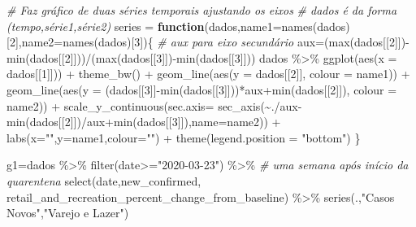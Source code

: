\documentclass[
]{book}
\newenvironment{Shaded}{\begin{snugshade}}{\end{snugshade}}
\newcommand{\AttributeTok}[1]{\textcolor[rgb]{0.77,0.63,0.00}{#1}}
\newcommand{\CommentTok}[1]{\textcolor[rgb]{0.56,0.35,0.01}{\textit{#1}}}
\newcommand{\ControlFlowTok}[1]{\textcolor[rgb]{0.13,0.29,0.53}{\textbf{#1}}}
\newcommand{\DecValTok}[1]{\textcolor[rgb]{0.00,0.00,0.81}{#1}}
\newcommand{\FunctionTok}[1]{\textcolor[rgb]{0.00,0.00,0.00}{#1}}
\newcommand{\NormalTok}[1]{#1}
\newcommand{\OtherTok}[1]{\textcolor[rgb]{0.56,0.35,0.01}{#1}}
\newcommand{\SpecialCharTok}[1]{\textcolor[rgb]{0.00,0.00,0.00}{#1}}
\newcommand{\StringTok}[1]{\textcolor[rgb]{0.31,0.60,0.02}{#1}}
\begin{document}
\begin{Shaded}
\begin{Highlighting}[]
\CommentTok{\# Faz gráfico de duas séries temporais ajustando os eixos}
\CommentTok{\# dados é da forma (tempo,série1,série2)}
\NormalTok{series }\OtherTok{=} \ControlFlowTok{function}\NormalTok{(dados,}\AttributeTok{name1=}\FunctionTok{names}\NormalTok{(dados)[}\DecValTok{2}\NormalTok{],}\AttributeTok{name2=}\FunctionTok{names}\NormalTok{(dados)[}\DecValTok{3}\NormalTok{])\{}
  \CommentTok{\# aux para eixo secundário}
\NormalTok{  aux}\OtherTok{=}\NormalTok{(}\FunctionTok{max}\NormalTok{(dados[[}\DecValTok{2}\NormalTok{]])}\SpecialCharTok{{-}}\FunctionTok{min}\NormalTok{(dados[[}\DecValTok{2}\NormalTok{]]))}\SpecialCharTok{/}\NormalTok{(}\FunctionTok{max}\NormalTok{(dados[[}\DecValTok{3}\NormalTok{]])}\SpecialCharTok{{-}}\FunctionTok{min}\NormalTok{(dados[[}\DecValTok{3}\NormalTok{]])) }
\NormalTok{  dados }\SpecialCharTok{\%\textgreater{}\%} \FunctionTok{ggplot}\NormalTok{(}\FunctionTok{aes}\NormalTok{(}\AttributeTok{x =}\NormalTok{ dados[[}\DecValTok{1}\NormalTok{]])) }\SpecialCharTok{+} \FunctionTok{theme\_bw}\NormalTok{() }\SpecialCharTok{+}
    \FunctionTok{geom\_line}\NormalTok{(}\FunctionTok{aes}\NormalTok{(}\AttributeTok{y =}\NormalTok{ dados[[}\DecValTok{2}\NormalTok{]], }\AttributeTok{colour =}\NormalTok{ name1)) }\SpecialCharTok{+}
    \FunctionTok{geom\_line}\NormalTok{(}\FunctionTok{aes}\NormalTok{(}\AttributeTok{y =}\NormalTok{ (dados[[}\DecValTok{3}\NormalTok{]]}\SpecialCharTok{{-}}\FunctionTok{min}\NormalTok{(dados[[}\DecValTok{3}\NormalTok{]]))}\SpecialCharTok{*}\NormalTok{aux}\SpecialCharTok{+}\FunctionTok{min}\NormalTok{(dados[[}\DecValTok{2}\NormalTok{]]), }\AttributeTok{colour =}\NormalTok{ name2)) }\SpecialCharTok{+}
    \FunctionTok{scale\_y\_continuous}\NormalTok{(}\AttributeTok{sec.axis=}
      \FunctionTok{sec\_axis}\NormalTok{(}\SpecialCharTok{\textasciitilde{}}\NormalTok{.}\SpecialCharTok{/}\NormalTok{aux}\SpecialCharTok{{-}}\FunctionTok{min}\NormalTok{(dados[[}\DecValTok{2}\NormalTok{]])}\SpecialCharTok{/}\NormalTok{aux}\SpecialCharTok{+}\FunctionTok{min}\NormalTok{(dados[[}\DecValTok{3}\NormalTok{]]),}\AttributeTok{name=}\NormalTok{name2)) }\SpecialCharTok{+}
    \FunctionTok{labs}\NormalTok{(}\AttributeTok{x=}\StringTok{""}\NormalTok{,}\AttributeTok{y=}\NormalTok{name1,}\AttributeTok{colour=}\StringTok{""}\NormalTok{) }\SpecialCharTok{+} \FunctionTok{theme}\NormalTok{(}\AttributeTok{legend.position =} \StringTok{"bottom"}\NormalTok{)}
\NormalTok{\}}

\NormalTok{g1}\OtherTok{=}\NormalTok{dados }\SpecialCharTok{\%\textgreater{}\%} 
  \FunctionTok{filter}\NormalTok{(date}\SpecialCharTok{\textgreater{}=}\StringTok{"2020{-}03{-}23"}\NormalTok{) }\SpecialCharTok{\%\textgreater{}\%} \CommentTok{\# uma semana após início da quarentena}
  \FunctionTok{select}\NormalTok{(date,new\_confirmed,}
\NormalTok{      retail\_and\_recreation\_percent\_change\_from\_baseline) }\SpecialCharTok{\%\textgreater{}\%} 
  \FunctionTok{series}\NormalTok{(.,}\StringTok{"Casos Novos"}\NormalTok{,}\StringTok{"Varejo e Lazer"}\NormalTok{)}


\end{Highlighting}
\end{Shaded}
\end{document}
